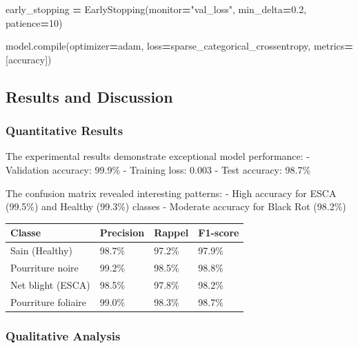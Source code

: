 \documentclass[
]{article}
\newenvironment{Shaded}{\begin{snugshade}}{\end{snugshade}}
\newcommand{\BuiltInTok}[1]{#1}
\newcommand{\DecValTok}[1]{\textcolor[rgb]{0.00,0.00,0.81}{#1}}
\newcommand{\FloatTok}[1]{\textcolor[rgb]{0.00,0.00,0.81}{#1}}
\newcommand{\NormalTok}[1]{#1}
\newcommand{\OperatorTok}[1]{\textcolor[rgb]{0.81,0.36,0.00}{\textbf{#1}}}
\newcommand{\StringTok}[1]{\textcolor[rgb]{0.31,0.60,0.02}{#1}}
\begin{document}
\begin{Shaded}
\begin{Highlighting}[]
\NormalTok{early\_stopping }\OperatorTok{=}\NormalTok{ EarlyStopping(monitor}\OperatorTok{=}\StringTok{"val\_loss"}\NormalTok{, min\_delta}\OperatorTok{=}\FloatTok{0.2}\NormalTok{, patience}\OperatorTok{=}\DecValTok{10}\NormalTok{)}

\NormalTok{model.}\BuiltInTok{compile}\NormalTok{(optimizer}\OperatorTok{=}\StringTok{\textquotesingle{}adam\textquotesingle{}}\NormalTok{,}
\NormalTok{              loss}\OperatorTok{=}\StringTok{\textquotesingle{}sparse\_categorical\_crossentropy\textquotesingle{}}\NormalTok{,}
\NormalTok{              metrics}\OperatorTok{=}\NormalTok{[}\StringTok{\textquotesingle{}accuracy\textquotesingle{}}\NormalTok{])}
\end{Highlighting}
\end{Shaded}

\subsection{Results and Discussion}\label{results-and-discussion}

\subsubsection{Quantitative Results}\label{quantitative-results}

The experimental results demonstrate exceptional model performance: -
Validation accuracy: 99.9\% - Training loss: 0.003 - Test accuracy:
98.7\%

The confusion matrix revealed interesting patterns: - High accuracy for
ESCA (99.5\%) and Healthy (99.3\%) classes - Moderate accuracy for Black
Rot (98.2\%)

\begin{longtable}[]{@{}llll@{}}
\toprule\noalign{}
Classe & Precision & Rappel & F1-score \\
\midrule\noalign{}
\endhead
\bottomrule\noalign{}
\endlastfoot
Sain (Healthy) & 98.7\% & 97.2\% & 97.9\% \\
Pourriture noire & 99.2\% & 98.5\% & 98.8\% \\
Net blight (ESCA) & 98.5\% & 97.8\% & 98.2\% \\
Pourriture foliaire & 99.0\% & 98.3\% & 98.7\% \\
\end{longtable}

\subsubsection{Qualitative Analysis}\label{qualitative-analysis}
\end{document}
